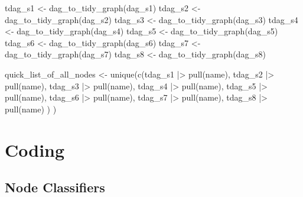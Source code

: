 \documentclass[
  letterpaper,
  DIV=11,
  numbers=noendperiod]{scrartcl}
\newenvironment{Shaded}{\begin{snugshade}}{\end{snugshade}}
\newcommand{\FunctionTok}[1]{\textcolor[rgb]{0.28,0.35,0.67}{#1}}
\newcommand{\NormalTok}[1]{\textcolor[rgb]{0.00,0.23,0.31}{#1}}
\newcommand{\OtherTok}[1]{\textcolor[rgb]{0.00,0.23,0.31}{#1}}
\newcommand{\SpecialCharTok}[1]{\textcolor[rgb]{0.37,0.37,0.37}{#1}}
\begin{document}
\begin{Shaded}
\begin{Highlighting}[]
\NormalTok{tdag\_s1 }\OtherTok{\textless{}{-}} \FunctionTok{dag\_to\_tidy\_graph}\NormalTok{(dag\_s1)}
\NormalTok{tdag\_s2 }\OtherTok{\textless{}{-}} \FunctionTok{dag\_to\_tidy\_graph}\NormalTok{(dag\_s2)}
\NormalTok{tdag\_s3 }\OtherTok{\textless{}{-}} \FunctionTok{dag\_to\_tidy\_graph}\NormalTok{(dag\_s3)}
\NormalTok{tdag\_s4 }\OtherTok{\textless{}{-}} \FunctionTok{dag\_to\_tidy\_graph}\NormalTok{(dag\_s4)}
\NormalTok{tdag\_s5 }\OtherTok{\textless{}{-}} \FunctionTok{dag\_to\_tidy\_graph}\NormalTok{(dag\_s5)}
\NormalTok{tdag\_s6 }\OtherTok{\textless{}{-}} \FunctionTok{dag\_to\_tidy\_graph}\NormalTok{(dag\_s6)}
\NormalTok{tdag\_s7 }\OtherTok{\textless{}{-}} \FunctionTok{dag\_to\_tidy\_graph}\NormalTok{(dag\_s7)}
\NormalTok{tdag\_s8 }\OtherTok{\textless{}{-}} \FunctionTok{dag\_to\_tidy\_graph}\NormalTok{(dag\_s8)}

\NormalTok{quick\_list\_of\_all\_nodes }\OtherTok{\textless{}{-}} \FunctionTok{unique}\NormalTok{(}\FunctionTok{c}\NormalTok{(tdag\_s1 }\SpecialCharTok{|\textgreater{}} \FunctionTok{pull}\NormalTok{(name), }
\NormalTok{                                    tdag\_s2 }\SpecialCharTok{|\textgreater{}} \FunctionTok{pull}\NormalTok{(name),}
\NormalTok{                                    tdag\_s3 }\SpecialCharTok{|\textgreater{}} \FunctionTok{pull}\NormalTok{(name),}
\NormalTok{                                    tdag\_s4 }\SpecialCharTok{|\textgreater{}} \FunctionTok{pull}\NormalTok{(name),}
\NormalTok{                                    tdag\_s5 }\SpecialCharTok{|\textgreater{}} \FunctionTok{pull}\NormalTok{(name),}
\NormalTok{                                    tdag\_s6 }\SpecialCharTok{|\textgreater{}} \FunctionTok{pull}\NormalTok{(name),}
\NormalTok{                                    tdag\_s7 }\SpecialCharTok{|\textgreater{}} \FunctionTok{pull}\NormalTok{(name),}
\NormalTok{                                    tdag\_s8 }\SpecialCharTok{|\textgreater{}} \FunctionTok{pull}\NormalTok{(name)}
\NormalTok{                                    )}
\NormalTok{                                  )}
\end{Highlighting}
\end{Shaded}

\section{Coding}\label{coding}

\subsection{Node Classifiers}\label{node-classifiers}
\end{document}
